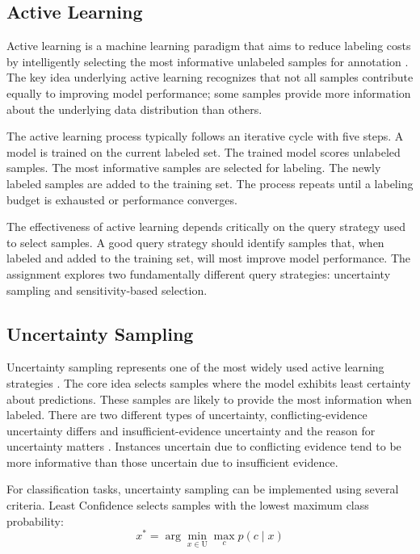 \documentclass[conference]{IEEEtran}
\newcommand{\set}[1]{\mathrm{#1}}  %
\begin{document}
\subsection{Active Learning}

Active learning is a machine learning paradigm that aims to reduce labeling costs by intelligently selecting the most informative unlabeled samples for annotation \cite{settles2009active}. The key idea underlying active learning recognizes that not all samples contribute equally to improving model performance; some samples provide more information about the underlying data distribution than others.

The active learning process typically follows an iterative cycle with five steps. A model is trained on the current labeled set. The trained model scores unlabeled samples. The most informative samples are selected for labeling. The newly labeled samples are added to the training set. The process repeats until a labeling budget is exhausted or performance converges.

The effectiveness of active learning depends critically on the query strategy used to select samples. A good query strategy should identify samples that, when labeled and added to the training set, will most improve model performance. The assignment explores two fundamentally different query strategies: uncertainty sampling and sensitivity-based selection.

\subsection{Uncertainty Sampling}

Uncertainty sampling represents one of the most widely used active learning strategies \cite{lewis1994heterogeneous,settles2009active}. The core idea selects samples where the model exhibits least certainty about predictions. These samples are likely to provide the most information when labeled. There are two different types of uncertainty, conflicting-evidence uncertainty differs and insufficient-evidence uncertainty and the reason for uncertainty matters \cite{sharma2016evidence}. Instances uncertain due to conflicting evidence tend to be more informative than those uncertain due to insufficient evidence.

For classification tasks, uncertainty sampling can be implemented using several criteria. Least Confidence selects samples with the lowest maximum class probability:
\begin{equation}
x^* = \arg\min_{x \in \set{U}} \max_c p(c \mid x)
\end{equation}
\end{document}
